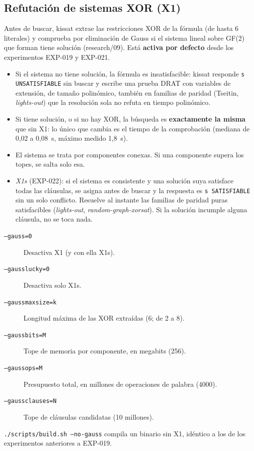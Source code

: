 \documentclass[11pt,a4paper]{article}
\begin{document}
\subsection{Refutación de sistemas XOR (X1)}
Antes de buscar, kissat extrae las restricciones XOR de la fórmula (de hasta
6 literales) y comprueba por eliminación de Gauss si el sistema lineal sobre
GF(2) que forman tiene solución (research/09). Está \textbf{activa por
defecto} desde los experimentos EXP-019 y EXP-021.
\begin{itemize}
  \item Si el sistema no tiene solución, la fórmula es insatisfacible: kissat
        responde \texttt{s UNSATISFIABLE} sin buscar y escribe una prueba DRAT
        con variables de extensión, de tamaño polinómico, también en familias
        de paridad (Tseitin, \emph{lights-out}) que la resolución sola no
        refuta en tiempo polinómico.
  \item Si tiene solución, o si no hay XOR, la búsqueda es \textbf{exactamente
        la misma} que sin X1: lo único que cambia es el tiempo de la
        comprobación (mediana de 0{,}02 a 0{,}08~s, máximo medido 1{,}8~s).
  \item El sistema se trata por componentes conexas. Si una componente supera
        los topes, se salta solo esa.
  \item \emph{X1s} (EXP-022): si el sistema es consistente y una solución suya
        satisface todas las cláusulas, se asigna antes de buscar y la
        respuesta es \texttt{s SATISFIABLE} sin un solo conflicto. Resuelve
        al instante las familias de paridad puras satisfacibles
        (\emph{lights-out}, \emph{random-graph-xorsat}). Si la solución
        incumple alguna cláusula, no se toca nada.
\end{itemize}
\begin{description}
  \item[\texttt{--gauss=0}] Desactiva X1 (y con ella X1s).
  \item[\texttt{--gausslucky=0}] Desactiva solo X1s.
  \item[\texttt{--gaussmaxsize=k}] Longitud máxima de las XOR extraídas (6;
        de 2 a 8).
  \item[\texttt{--gaussbits=M}] Tope de memoria por componente, en megabits
        (256).
  \item[\texttt{--gaussops=M}] Presupuesto total, en millones de operaciones de
        palabra (4000).
  \item[\texttt{--gaussclauses=N}] Tope de cláusulas candidatas (10 millones).
\end{description}
\texttt{./scripts/build.sh --no-gauss} compila un binario sin X1, idéntico a
los de los experimentos anteriores a EXP-019.
\end{document}
